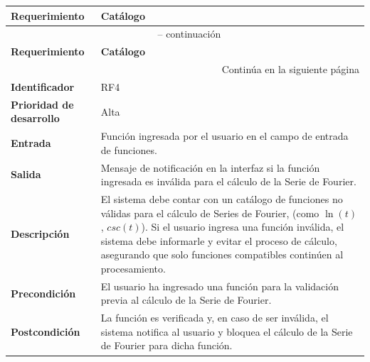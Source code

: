 \begin{longtable}{|m{3.5cm}|m{9.5cm}|}
	\hline
	\rowcolor{black!75} \color{white}\textbf{Requerimiento} & \color{white}\textbf{Catálogo} \\
	\hline
	\endfirsthead
	\multicolumn{2}{c}{{\tablename\ \thetable{} -- continuación}} \\
	\hline
	\rowcolor{black!75} \color{white}\textbf{Requerimiento} & \color{white}\textbf{Catálogo} \\
	\hline
	\endhead
	\hline \multicolumn{2}{r}{{Continúa en la siguiente página}} \\
	\endfoot
	\hline
	\endlastfoot
	
	\textbf{Identificador} & RF4 \\
	\hline
	\textbf{Prioridad de desarrollo} & Alta \\
	\hline
	\textbf{Entrada} & Función ingresada por el usuario en el campo de entrada de funciones. \\
	\hline
	\textbf{Salida} & Mensaje de notificación en la interfaz si la función ingresada es inválida para el cálculo de la Serie de Fourier. \\
	\hline
	\textbf{Descripción} & El sistema debe contar con un catálogo de funciones no válidas para el cálculo de Series de Fourier, (como \( \ln(t) \), $csc(t)$). Si el usuario ingresa una función inválida, el sistema debe informarle y evitar el proceso de cálculo, asegurando que solo funciones compatibles continúen al procesamiento. \\
	\hline
	\textbf{Precondición} & El usuario ha ingresado una función para la validación previa al cálculo de la Serie de Fourier. \\
	\hline
	\textbf{Postcondición} & La función es verificada y, en caso de ser inválida, el sistema notifica al usuario y bloquea el cálculo de la Serie de Fourier para dicha función. \\
	\hline
\end{longtable}
\caption{Requerimiento funcional No. 4} \label{tabla:RF4}
\vspace{0.5cm}


